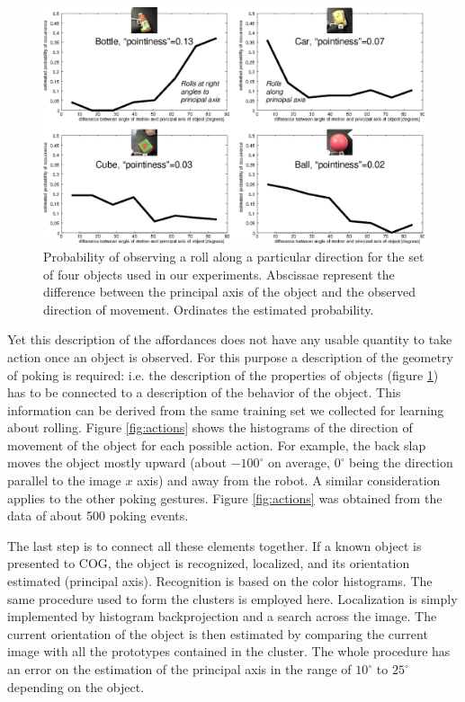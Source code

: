 \begin{figure}[tbh]
\begin{center}
\includegraphics[width=\columnwidth]{affordances.eps}
\caption{ 
\label{fig:affordances}
%
Probability of observing a roll along a particular direction for the set
of four objects used in our experiments. Abscissae represent the difference
between the principal axis of the object and the observed direction of 
movement. Ordinates the estimated probability.
%
}
\end{center}
\end{figure}

Yet this description of the affordances does not have any usable quantity to 
take action once an object is observed. For this purpose a description of 
the geometry of poking is required: i.e. the description of the properties of 
objects (figure \ref{fig:affordances}) has to be connected to a description
of the behavior of the object. 
This information can be derived from the same training set we collected for learning
about rolling. Figure \ref{fig:actions} shows the histograms of the direction 
of movement of the object for
each possible action. For example, the back slap moves the object mostly upward
(about $-100^\circ$ on average, $0^\circ$ being the direction parallel to the image
$x$ axis) and away from the robot. A similar consideration applies
to the other poking gestures. Figure \ref{fig:actions} was obtained from the data of
about 500 poking events.

The last step is to connect all these elements together. If a known object is
presented to COG, the object is recognized, localized, and
its orientation estimated (principal axis). Recognition is based on the color histograms. The same
procedure used to form the clusters is employed here. Localization is simply implemented 
by histogram backprojection and a search across the image. The current orientation of the
object is then estimated by comparing the current image with all the prototypes 
contained in the cluster. The whole procedure has an error on the estimation
of the principal axis in the range of $10^\circ$ to $25^\circ$ depending on the object.  

